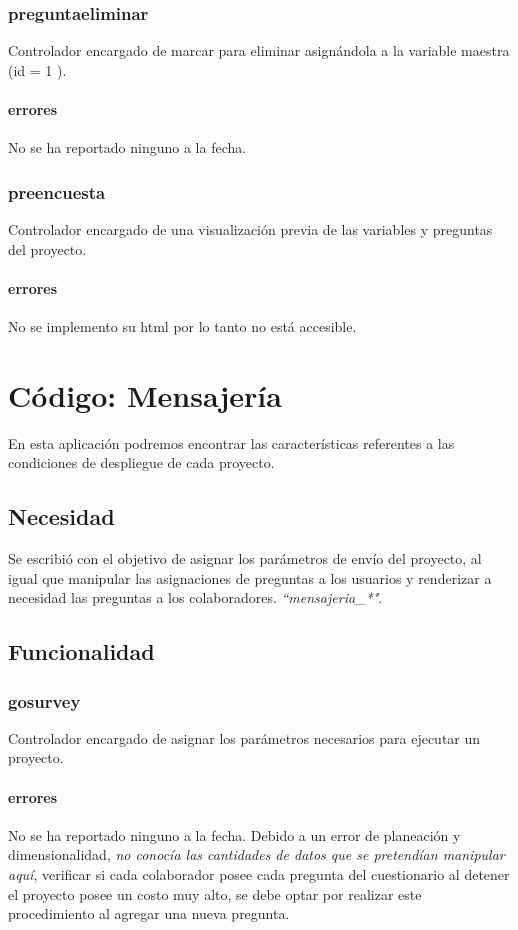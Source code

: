 \documentclass[10pt,a4paper]{book}
\begin{document}
	\subsection{preguntaeliminar}
	Controlador encargado de marcar para eliminar asignándola a la variable maestra (id = 1 ).
	\subsubsection{errores}
	No se ha reportado ninguno a la fecha.
	
	\subsection{preencuesta}
	Controlador encargado de una visualización previa de las variables y preguntas del proyecto.
	\subsubsection{errores}
	No se implemento su html por lo tanto no está accesible.
	

	\chapter{Código: Mensajería}
	
	En esta aplicación podremos encontrar las características referentes a las condiciones de despliegue de cada proyecto.
	
	\section{Necesidad}
	
	Se escribió con el objetivo de asignar los parámetros de envío del proyecto, al igual que manipular las asignaciones de preguntas a los usuarios y renderizar a necesidad las preguntas a los colaboradores. \textit{``mensajeria\_*"}. 
	
	\section{Funcionalidad}
		
	\subsection{gosurvey}
	Controlador encargado de asignar los parámetros necesarios para ejecutar un proyecto.
	\subsubsection{errores}
	No se ha reportado ninguno a la fecha. Debido a un error de planeación y dimensionalidad, \textit{no conocía las cantidades de datos que se pretendían manipular aquí}, verificar si cada colaborador posee cada pregunta del cuestionario al detener el proyecto posee un costo muy alto, se debe optar por realizar este procedimiento al agregar una nueva pregunta.
	
\end{document}
